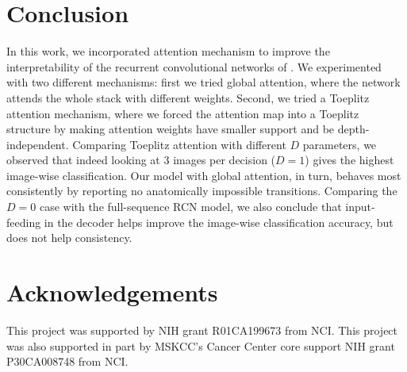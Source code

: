 \documentclass{article}
\begin{document}
\section{Conclusion}
In this work, we incorporated attention mechanism to improve the interpretability of the recurrent convolutional networks of \citep{bozkurt2017delineation}. We experimented with two different mechanisms: first we tried global attention, where the network attends the whole stack with different weights. Second, we tried a Toeplitz attention mechanism, where we forced the attention map into a Toeplitz structure by making attention weights have smaller support and be depth-independent. Comparing Toeplitz attention with different $D$ parameters, we observed that indeed looking at 3 images per decision ($D=1$) gives the highest image-wise classification. Our model with global attention, in turn, behaves most consistently by reporting no anatomically impossible transitions. Comparing the $D=0$ case with the full-sequence RCN model, we also conclude that input-feeding in the decoder helps improve the image-wise classification accuracy, but does not help consistency.     

\section{Acknowledgements}
This project was supported by NIH grant R01CA199673 from NCI. This project was also supported in part by MSKCC's Cancer Center core support NIH grant P30CA008748 from NCI.



\end{document}
